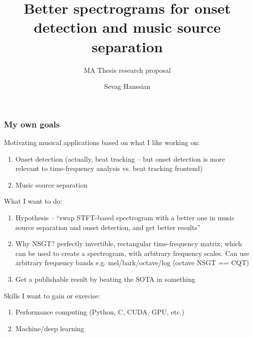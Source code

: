 \documentclass[usenames,dvipsnames]{beamer}
\title{Better spectrograms for onset detection and music source separation}
\subtitle{MA Thesis research proposal}
\author{Sevag Hanssian}
\institute{DDMAL, McGill}
\begin{document}
\begin{frame}
\maketitle
\end{frame}

\begin{frame}
	\frametitle{My own goals}
	Motivating musical applications based on what I like working on:
	\begin{enumerate}
		\item
			Onset detection (actually, beat tracking -- but onset detection is more relevant to time-frequency analysis vs. beat tracking frontend)
		\item
			Music source separation
	\end{enumerate}
	What I want to do:
	\begin{enumerate}
		\item
			Hypothesis -- ``swap STFT-based spectrogram with a better one in music source separation and onset detection, and get better results''
		\item
			Why NSGT? perfectly invertible, rectangular time-frequency matrix, which can be used to create a spectrogram, with arbitrary frequency scales. Can use arbitrary frequency bands e.g. mel/bark/octave/log (octave NSGT == CQT)
		\item
			Get a publishable result by beating the SOTA in something
	\end{enumerate}
	Skills I want to gain or exercise:
	\begin{enumerate}
		\item
			Performance computing (Python, C, CUDA, GPU, etc.)
		\item
			Machine/deep learning
	\end{enumerate}
\end{frame}
\end{document}
